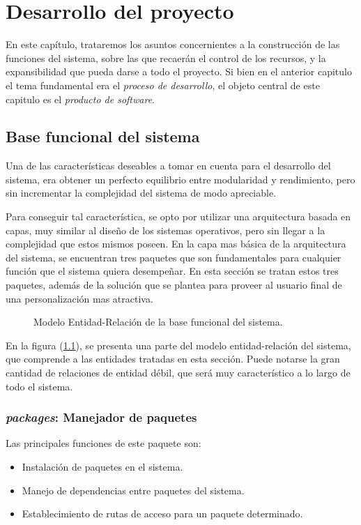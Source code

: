 \chapter{Desarrollo del proyecto}

En este capítulo, trataremos los asuntos concernientes a la construcción de las
funciones del sistema, sobre las que recaerán el control de los recursos, y la
expansibilidad que pueda darse a todo el proyecto. Si bien en el anterior
capitulo el tema fundamental era el \emph{proceso de desarrollo}, el objeto
central de este capitulo es el \emph{producto de software}.

\section{Base funcional del sistema}
Una de las características deseables a tomar en cuenta para el desarrollo del
sistema, era obtener un perfecto equilibrio entre modularidad y rendimiento,
pero sin incrementar la complejidad del sistema de modo apreciable.

Para conseguir tal característica, se opto por utilizar una arquitectura basada
en capas, muy similar al diseño de los sistemas operativos, pero sin llegar a la
complejidad que estos mismos poseen. En la capa mas básica de la arquitectura
del sistema, se encuentran tres paquetes que son fundamentales para cualquier
función que el sistema quiera desempeñar. En esta sección se tratan estos tres
paquetes, además de la solución que se plantea para proveer al usuario final de
una personalización mas atractiva.

\begin{figure}
\centering

\caption{Modelo Entidad-Relación de la base funcional del sistema.}
\label{modelo1}
\end{figure}

En la figura (\ref{modelo1}), se presenta una parte del modelo entidad-relación
del sistema, que comprende a las entidades tratadas en esta sección. Puede
notarse la gran cantidad de relaciones de entidad débil, que será muy
característico a lo largo de todo el sistema.

\subsection{\emph{packages}: Manejador de paquetes}
Las principales funciones de este paquete son:

\begin{itemize}
\item Instalación de paquetes en el sistema.
\item Manejo de dependencias entre paquetes del sistema.
\item Establecimiento de rutas de acceso para un paquete determinado.
\end{itemize}

